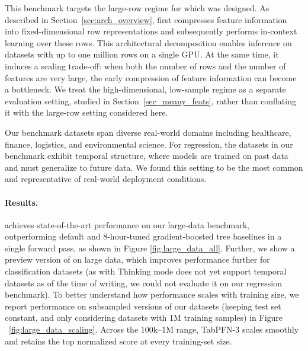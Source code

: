 This benchmark targets the large-row regime for which \ourmodel was designed. As described in Section~\ref{sec:arch_overview}, \ourmodel first compresses feature information into fixed-dimensional row representations and subsequently performs in-context learning over these rows.
This architectural decomposition enables inference on datasets with up to one million rows on a single GPU.
At the same time, it induces a scaling trade-off: when both the number of rows and the number of features are very large, the early compression of feature information can become a bottleneck.
We treat the high-dimensional, low-sample regime as a separate evaluation setting, studied in Section~\ref{sec_meany_feats}, rather than conflating it with the large-row setting considered here.

Our benchmark datasets span diverse real-world domains including healthcare,
finance, logistics, and environmental science. For regression, the datasets in our benchmark exhibit temporal structure, where models are trained on past data and must generalize to future data. We found this setting to be the most common and representative of real-world deployment conditions.


\paragraph{Results.} \ourmodel achieves state-of-the-art performance on our large-data benchmark, outperforming default and 8-hour-tuned
gradient-boosted tree baselines in a single forward pass, as shown in Figure \ref{fig:large_data_all}. Further, we show a preview version of \ourmodelenhanced on large data, which improves \ourmodel performance further for classification datasets (as \ourmodelplus with Thinking mode does not yet support temporal datasets as of the time of writing, we could not evaluate it on our regression benchmark). To better understand how \ourmodel performance scales with training size, we report performance on subsampled versions of our datasets (keeping test set constant, and only considering datasets with 1M training samples) in Figure ~\ref{fig:large_data_scaling}. Across the 100k–1M range, TabPFN-3 scales smoothly and retains the top normalized score at every training-set size.




